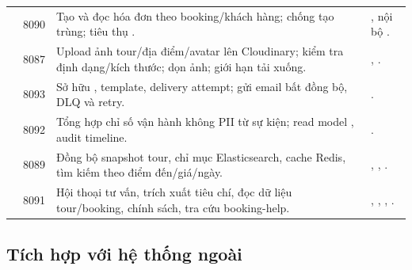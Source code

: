 \begin{longtable}{@{}L{4.1cm}C{2.4cm}L{4.0cm}L{4.0cm}@{}}
 & 8090 \newline {} & Tạo và đọc hóa đơn theo booking/khách hàng; chống tạo trùng; tiêu thụ . & , nội bộ .\\
 & 8087 \newline {} & Upload ảnh tour/địa điểm/avatar lên Cloudinary; kiểm tra định dạng/kích thước; dọn ảnh; giới hạn tải xuống. & , .\\
 & 8093 \newline {} & Sở hữu , template, delivery attempt; gửi email bất đồng bộ, DLQ và retry. & .\\
 & 8092 \newline {} & Tổng hợp chỉ số vận hành không PII từ sự kiện; read model , audit timeline. & .\\
 & 8089 \newline {} & Đồng bộ snapshot tour, chỉ mục Elasticsearch, cache Redis, tìm kiếm theo điểm đến/giá/ngày. & , , .\\
 & 8091 \newline {} & Hội thoại tư vấn, trích xuất tiêu chí, đọc dữ liệu tour/booking, chính sách, tra cứu booking-help. & , , , .\\
\end{longtable}

\subsection{Tích hợp với hệ thống ngoài}

